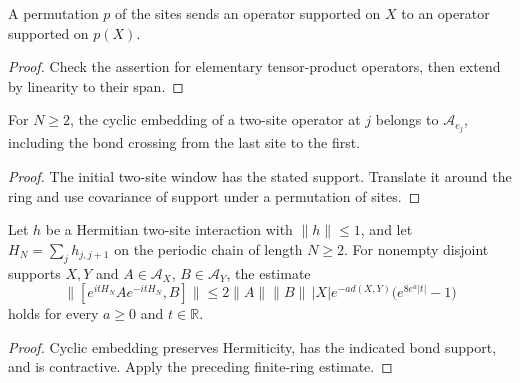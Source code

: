 \begin{lemma}
    \label{aux:permuted-operator-support}
    \leanok
    A permutation $p$ of the sites sends an operator supported on $X$ to an
    operator supported on $p(X)$.
\end{lemma}
\begin{proof}\leanok
    Check the assertion for elementary tensor-product operators, then extend by
    linearity to their span.
\end{proof}

\begin{lemma}
    \label{aux:cyclic-two-site-embedding-support}
    \leanok
    For $N\geq2$, the cyclic embedding of a two-site operator at $j$ belongs to
    $\mathcal A_{e_j}$, including the bond crossing from the last site to the first.
\end{lemma}
\begin{proof}\leanok
    The initial two-site window has the stated support. Translate it around the
    ring and use covariance of support under a permutation of sites.
\end{proof}

\begin{lemma}
    \label{aux:interaction-hamiltonian-lieb-robinson}
    \leanok
    Let $h$ be a Hermitian two-site interaction with $\|h\|\leq1$, and let
    $H_N=\sum_j h_{j,j+1}$ on the periodic chain of length $N\geq2$.
    For nonempty disjoint supports $X,Y$ and $A\in\mathcal A_X$, $B\in\mathcal A_Y$,
    the estimate
    \[
        \|[e^{itH_N}Ae^{-itH_N},B]\|
        \leq2\|A\|\|B\|\,|X|e^{-a d(X,Y)}
        \bigl(e^{8e^a|t|}-1\bigr)
    \]
    holds for every $a\geq0$ and $t\in\mathbb R$.
\end{lemma}
\begin{proof}\leanok
    Cyclic embedding preserves Hermiticity, has the indicated bond support,
    and is contractive. Apply the preceding finite-ring estimate.
\end{proof}


